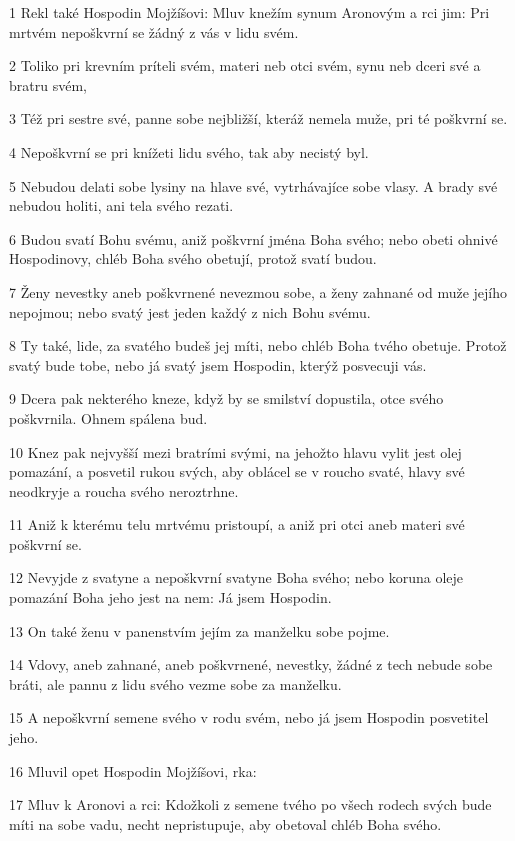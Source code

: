 \par 1 Rekl také Hospodin Mojžíšovi: Mluv knežím synum Aronovým a rci jim: Pri mrtvém nepoškvrní se žádný z vás v lidu svém.
\par 2 Toliko pri krevním príteli svém, materi neb otci svém, synu neb dceri své a bratru svém,
\par 3 Též pri sestre své, panne sobe nejbližší, kteráž nemela muže, pri té poškvrní se.
\par 4 Nepoškvrní se pri knížeti lidu svého, tak aby necistý byl.
\par 5 Nebudou delati sobe lysiny na hlave své, vytrhávajíce sobe vlasy. A brady své nebudou holiti, ani tela svého rezati.
\par 6 Budou svatí Bohu svému, aniž poškvrní jména Boha svého; nebo obeti ohnivé Hospodinovy, chléb Boha svého obetují, protož svatí budou.
\par 7 Ženy nevestky aneb poškvrnené nevezmou sobe, a ženy zahnané od muže jejího nepojmou; nebo svatý jest jeden každý z nich Bohu svému.
\par 8 Ty také, lide, za svatého budeš jej míti, nebo chléb Boha tvého obetuje. Protož svatý bude tobe, nebo já svatý jsem Hospodin, kterýž posvecuji vás.
\par 9 Dcera pak nekterého kneze, když by se smilství dopustila, otce svého poškvrnila. Ohnem spálena bud.
\par 10 Knez pak nejvyšší mezi bratrími svými, na jehožto hlavu vylit jest olej pomazání, a posvetil rukou svých, aby oblácel se v roucho svaté, hlavy své neodkryje a roucha svého neroztrhne.
\par 11 Aniž k kterému telu mrtvému pristoupí, a aniž pri otci aneb materi své poškvrní se.
\par 12 Nevyjde z svatyne a nepoškvrní svatyne Boha svého; nebo koruna oleje pomazání Boha jeho jest na nem: Já jsem Hospodin.
\par 13 On také ženu v panenstvím jejím za manželku sobe pojme.
\par 14 Vdovy, aneb zahnané, aneb poškvrnené, nevestky, žádné z tech nebude sobe bráti, ale pannu z lidu svého vezme sobe za manželku.
\par 15 A nepoškvrní semene svého v rodu svém, nebo já jsem Hospodin posvetitel jeho.
\par 16 Mluvil opet Hospodin Mojžíšovi, rka:
\par 17 Mluv k Aronovi a rci: Kdožkoli z semene tvého po všech rodech svých bude míti na sobe vadu, necht nepristupuje, aby obetoval chléb Boha svého.
